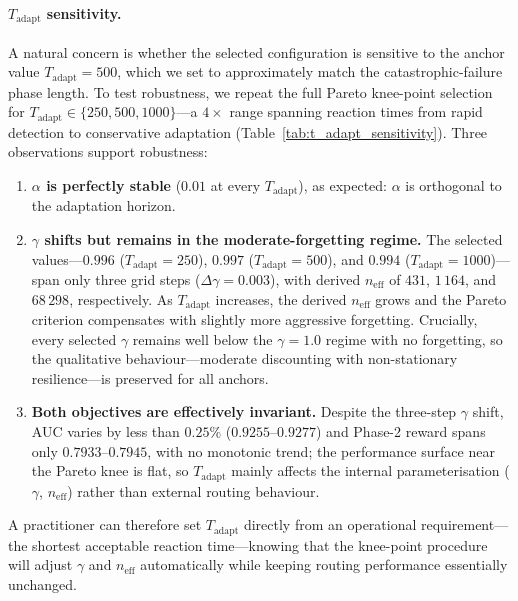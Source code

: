 
\paragraph{$T_{\text{adapt}}$ sensitivity.}
A natural concern is whether the selected configuration is sensitive
to the anchor value $T_{\text{adapt}}{=}500$, which we set to
approximately match the catastrophic-failure phase length.
To test robustness, we repeat the full Pareto knee-point selection
for $T_{\text{adapt}} \in \{250, 500, 1000\}$---a $4{\times}$ range
spanning reaction times from rapid detection to conservative
adaptation (Table~\ref{tab:t_adapt_sensitivity}).
Three observations support robustness:

\begin{enumerate}[nosep,leftmargin=*]
  \item \textbf{$\alpha$ is perfectly stable}
    ($0.01$ at every $T_{\text{adapt}}$), as expected:
    $\alpha$ is orthogonal to the adaptation horizon.

  \item \textbf{$\gamma$ shifts but remains in the
    moderate-forgetting regime.}
    The selected values---$0.996$ ($T_{\text{adapt}}{=}250$),
    $0.997$ ($T_{\text{adapt}}{=}500$), and $0.994$
    ($T_{\text{adapt}}{=}1000$)---span only three grid steps
    ($\Delta\gamma = 0.003$), with derived $n_{\text{eff}}$ of
    $431$, $1\,164$, and $68\,298$, respectively.
    As $T_{\text{adapt}}$ increases, the derived $n_{\text{eff}}$
    grows and the Pareto criterion compensates with slightly more
    aggressive forgetting.
    Crucially, every selected $\gamma$ remains well below the
    $\gamma{=}1.0$ regime with no forgetting, so the qualitative
    behaviour---moderate discounting with non-stationary
    resilience---is preserved for all anchors.

  \item \textbf{Both objectives are effectively invariant.}
    Despite the three-step $\gamma$ shift,
    AUC varies by less than $0.25\%$ ($0.9255$--$0.9277$) and
    Phase-2 reward spans only $0.7933$--$0.7945$, with no monotonic
    trend; the performance surface near the Pareto knee is flat, so
    $T_{\text{adapt}}$ mainly affects the internal
    parameterisation ($\gamma$, $n_{\text{eff}}$) rather than
    external routing behaviour.
\end{enumerate}
%
A practitioner can therefore set $T_{\text{adapt}}$ directly from an
operational requirement---the shortest acceptable reaction
time---knowing that the knee-point procedure will adjust $\gamma$ and
$n_{\text{eff}}$ automatically while keeping routing performance
essentially unchanged.



\FloatBarrier
